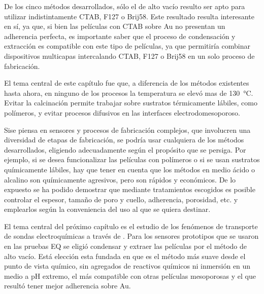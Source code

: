 	De los cinco métodos desarrollados, sólo el de alto vacío resulto ser apto para utilizar indistintamente CTAB, F127 o Brij58. Este resultado resulta interesante en sí, ya que, si bien las películas con CTAB sobre Au no presentan un adherencia perfecta, es importante saber que el proceso de condensación y extracción es compatible con este tipo de películas, ya que permitiría combinar dispositivos multicapas intercalando CTAB, F127 o Brij58 en un solo proceso de fabricación.

	El tema central de este capítulo fue que, a diferencia de los métodos existentes hasta ahora, en ninguno de los procesos la temperatura se elevó mas de \SI{130}{\celsius}. Evitar la calcinación permite trabajar sobre sustratos térmicamente lábiles, como polímeros, y evitar procesos difusivos en las interfaces electrodo\textbar mesoporoso. 

	Si\space se piensa en sensores y procesos de fabricación complejos, que involucren una diversidad de etapas de fabricación, se podría usar cualquiera de los métodos desarrollados, eligiendo adecuadamente según el propósito que se persiga. Por ejemplo, si se desea funcionalizar las películas con polímeros o si se usan sustratos químicamente lábiles, hay que tener en cuenta que los métodos en medio ácido o alcalino son químicamente agresivos, pero son rápidos y económicos. De lo expuesto se ha podido demostrar que mediante tratamientos escogidos es posible controlar el espesor, tamaño de poro y cuello, adherencia, porosidad, etc. y emplearlos según la conveniencia del uso al que se quiera destinar.

	El tema central del próximo capítulo es el estudio de los fenómenos de transporte de sondas electroquímicas a través de \pdm. Para los sensores prototipos que se usaron en las pruebas EQ se eligió condensar y extraer las películas por el método de alto vacío. Está elección esta fundada en que es el método más suave desde el punto de vista químico, sin agregados de reactivos químicos ni inmersión en un medio a pH extremo, el más compatible con otras películas mesoporosas y el que resultó tener mejor adherencia sobre Au. 			 
